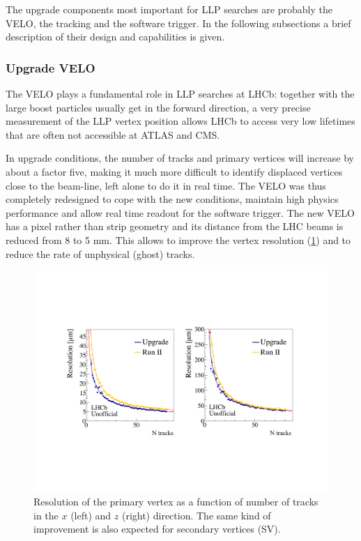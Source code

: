 The upgrade components most important for LLP searches are probably the  VELO, the tracking and the software trigger. In the following subsections a brief description of their design and capabilities is given.


\subsubsection{Upgrade VELO}
The VELO plays a fundamental role in LLP searches at LHCb: together with the large boost particles usually get in the forward direction, a very precise measurement of the LLP vertex position allows LHCb to access very low lifetimes that are often not accessible at ATLAS and CMS.

In upgrade conditions, the number of tracks and primary vertices will increase by about a factor five, making it much more difficult to identify displaced vertices close to the beam-line, left alone to do it in real time.
The VELO was thus completely redesigned to cope with the new conditions, maintain high physics performance and allow real time readout for the software trigger. The new VELO has a pixel rather than strip geometry and its distance from the LHC beams is reduced from 8 to 5 mm. This allows to improve the vertex resolution (\ref{fig:ulhcb_pvres}) and to reduce the rate of unphysical (ghost) tracks.

\begin{figure}[h]
\centerline{\includegraphics[width=\textwidth]{figures/lhcb_vertexres.pdf}}
  \caption{Resolution of the primary vertex as a function of number of tracks in the $x$ (left) and $z$ (right) direction. The same kind of improvement is also expected for secondary vertices (SV).}
  \label{fig:ulhcb_pvres}
\end{figure}

